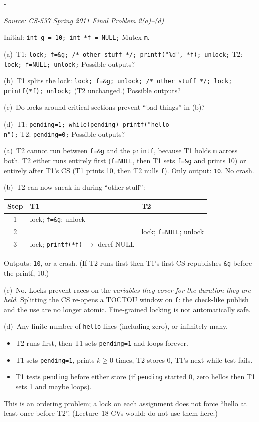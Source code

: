 \documentclass[11pt,a4paper]{article}
\makeatletter
\newcommand{\keepspace}[1]{\par\penalty-100\begingroup
  \setlength{\dimen@}{#1}\dimen@ii\pagegoal\advance\dimen@ii-\pagetotal
  \ifdim\dimen@>\dimen@ii\ifdim\dimen@ii>\z@\vfil\fi\break\fi\endgroup}
\newcounter{qn}[section]
\newenvironment{Qn}[4]{%
  \refstepcounter{qn}\keepspace{7\baselineskip}%
  \begin{tcolorbox}[qboxstyle, title={Q\thesection.\theqn\ \ [#1 \textbar\ #2]\ \ #4}]%
  {\footnotesize\color{g3}\textit{Source: #3}}\par\smallskip%
}{%
  \end{tcolorbox}%
}
\newenvironment{Sol}{%
  \begin{tcolorbox}[sboxstyle, title={Solution}]%
}{%
  \end{tcolorbox}\vspace{0.35em}%
}
\makeatother
\begin{document}
\begin{Qn}{Hard}{Lect 16--17}{CS-537 Spring 2011 Final Problem 2(a)--(d)}{Coarse lock vs.\ fine lock vs.\ a bare flag}
Initial: \texttt{int g = 10; int *f = NULL;} Mutex \texttt{m}.

(a)~T1: \texttt{lock; f=\&g; /* other stuff */; printf("\%d", *f); unlock;}
T2: \texttt{lock; f=NULL; unlock;}
Possible outputs?

(b)~T1 splits the lock: \texttt{lock; f=\&g; unlock; /* other stuff */; lock; printf(*f); unlock;}
(T2 unchanged.) Possible outputs?

(c)~Do locks around critical sections prevent ``bad things'' in (b)?

(d)~T1: \texttt{pending=1; while(pending) printf("hello\\n");} \quad T2: \texttt{pending=0;}
Possible outputs?
\end{Qn}
\begin{Sol}
(a)~T2 cannot run between \texttt{f=\&g} and the \texttt{printf}, because T1 holds \texttt{m} across both. T2 either runs entirely first (\texttt{f=NULL}, then T1 sets \texttt{f=\&g} and prints 10) or entirely after T1's CS (T1 prints 10, then T2 nulls \texttt{f}). Only output: \texttt{10}. No crash.

(b)~T2 can now sneak in during ``other stuff'':
\begin{center}
\begin{tabular}{c|l|l}
Step & T1 & T2 \\
\hline
1 & lock; \texttt{f=\&g}; unlock & \\
2 & & lock; \texttt{f=NULL}; unlock \\
3 & lock; \texttt{printf(*f)} $\to$ deref NULL & \\
\end{tabular}
\end{center}
Outputs: \texttt{10}, or a crash. (If T2 runs first then T1's first CS republishes \texttt{\&g} before the printf, 10.)

(c)~No. Locks prevent races on the \emph{variables they cover for the duration they are held}. Splitting the CS re-opens a TOCTOU window on \texttt{f}: the check-like publish and the use are no longer atomic. Fine-grained locking is not automatically safe.

(d)~Any finite number of \texttt{hello} lines (including zero), or infinitely many.
\begin{itemize}
\item T2 runs first, then T1 sets \texttt{pending=1} and loops forever.
\item T1 sets \texttt{pending=1}, prints $k\ge 0$ times, T2 stores 0, T1's next while-test fails.
\item T1 tests \texttt{pending} before either store (if \texttt{pending} started 0, zero hellos then T1 sets 1 and maybe loops).
\end{itemize}
This is an ordering problem; a lock on each assignment does not force ``hello at least once before T2''. (Lecture~18 CVs would; do not use them here.)
\end{Sol}
\end{document}
